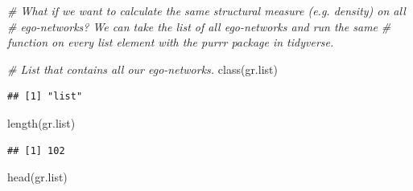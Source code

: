 \documentclass[
]{book}
\newenvironment{Shaded}{\begin{snugshade}}{\end{snugshade}}
\newcommand{\CommentTok}[1]{\textcolor[rgb]{0.56,0.35,0.01}{\textit{#1}}}
\newcommand{\FunctionTok}[1]{\textcolor[rgb]{0.00,0.00,0.00}{#1}}
\newcommand{\NormalTok}[1]{#1}
\begin{document}
\begin{Shaded}
\begin{Highlighting}[]
\CommentTok{\# What if we want to calculate the same structural measure (e.g. density) on all}
\CommentTok{\# ego{-}networks? We can take the list of all ego{-}networks and run the same }
\CommentTok{\# function on every list element with the purrr package in tidyverse.}

\CommentTok{\# List that contains all our ego{-}networks.}
\FunctionTok{class}\NormalTok{(gr.list)}
\end{Highlighting}
\end{Shaded}

\begin{verbatim}
## [1] "list"
\end{verbatim}

\begin{Shaded}
\begin{Highlighting}[]
\FunctionTok{length}\NormalTok{(gr.list)}
\end{Highlighting}
\end{Shaded}

\begin{verbatim}
## [1] 102
\end{verbatim}

\begin{Shaded}
\begin{Highlighting}[]
\FunctionTok{head}\NormalTok{(gr.list)}
\end{Highlighting}
\end{Shaded}
\end{document}
